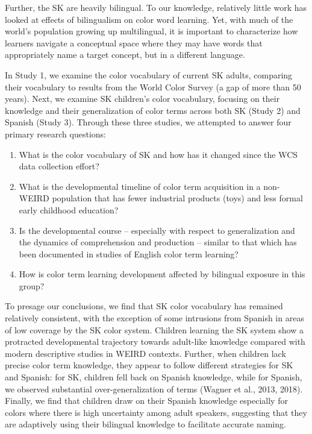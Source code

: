 \documentclass[
  english,
  ,apa7,floatsintext]{apa6}
\providecommand{\tightlist}{%
  \setlength{\itemsep}{0pt}\setlength{\parskip}{0pt}}
\begin{document}
Further, the SK are heavily bilingual. To our knowledge, relatively little work has looked at effects of bilingualism on color word learning. Yet, with much of the world's population growing up multilingual, it is important to characterize how learners navigate a conceptual space where they may have words that appropriately name a target concept, but in a different language.

In Study 1, we examine the color vocabulary of current SK adults, comparing their vocabulary to results from the World Color Survey (a gap of more than 50 years). Next, we examine SK children's color vocabulary, focusing on their knowledge and their generalization of color terms across both SK (Study 2) and Spanish (Study 3). Through these three studies, we attempted to answer four primary research questions:

\begin{enumerate}
\def\labelenumi{\arabic{enumi}.}
\tightlist
\item
  What is the color vocabulary of SK and how has it changed since the WCS data collection effort?
\item
  What is the developmental timeline of color term acquisition in a non-WEIRD population that has fewer industrial products (toys) and less formal early childhood education?
\item
  Is the developmental course -- especially with respect to generalization and the dynamics of comprehension and production -- similar to that which has been documented in studies of English color term learning?
\item
  How is color term learning development affected by bilingual exposure in this group?
\end{enumerate}

To presage our conclusions, we find that SK color vocabulary has remained relatively consistent, with the exception of some intrusions from Spanish in areas of low coverage by the SK color system. Children learning the SK system show a protracted developmental trajectory towards adult-like knowledge compared with modern descriptive studies in WEIRD contexts. Further, when children lack precise color term knowledge, they appear to follow different strategies for SK and Spanish: for SK, children fell back on Spanish knowledge, while for Spanish, we observed substantial over-generalization of terms (Wagner et al., 2013, 2018). Finally, we find that children draw on their Spanish knowledge especially for colors where there is high uncertainty among adult speakers, suggesting that they are adaptively using their bilingual knowledge to facilitate accurate naming.
\end{document}
